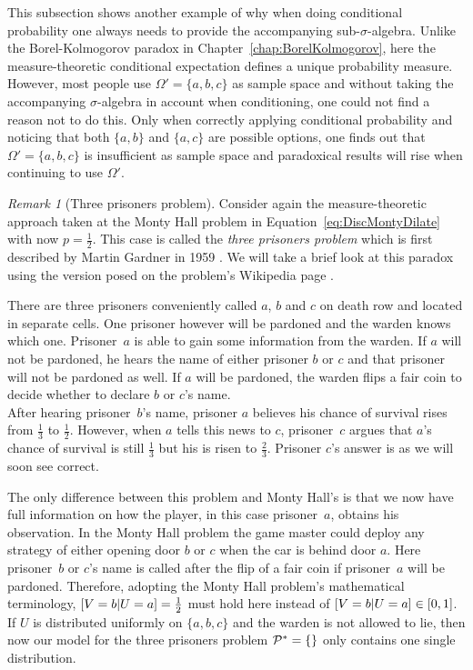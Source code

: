 \documentclass[a4paper]{report}
\theoremstyle{plain}
\theoremstyle{definition}
\theoremstyle{remark}
\newtheorem{remark}[theorem]{Remark}
\numberwithin{equation}{chapter}
\let\P\relax
\DeclareMathOperator{\P}{\mathbb{P}}
\DeclareMathOperator{\1}{\mathbbm{1}}
\newcommand{\Pmod}{\mathcal{P}^*}
\begin{document}
This subsection shows another example of why when doing conditional probability one always needs to provide the accompanying sub-$\sigma$-algebra. Unlike the Borel-Kolmogorov paradox in Chapter~\ref{chap:BorelKolmogorov}, here the measure-theoretic conditional expectation defines a unique probability measure. However, most people use $\Omega'=\{a,b,c\}$ as sample space and without taking the accompanying $\sigma$-algebra in account when conditioning, one could not find a reason not to do this. Only when correctly applying conditional probability and noticing that both $\{a,b\}$ and $\{a,c\}$ are possible options, one finds out that $\Omega'=\{a,b,c\}$ is insufficient as sample space and paradoxical results will rise when continuing to use $\Omega'$.

\begin{remark}[Three prisoners problem]
Consider again the measure-theoretic approach taken at the Monty Hall problem in Equation~\ref{eq:DiscMontyDilate} with now $p=\frac{1}{2}$. This case is called the \emph{three prisoners problem} which is first described by Martin Gardner in 1959 \cite{Gardner59}. We will take a brief look at this paradox using the version posed on the problem's Wikipedia page \cite{WikiPrisoners}.

There are three prisoners conveniently called $a$, $b$ and $c$ on death row and located in separate cells. One prisoner however will be pardoned and the warden knows which one. Prisoner~$a$ is able to gain some information from the warden. If $a$ will not be pardoned, he hears the name of either prisoner $b$ or $c$ and that prisoner will not be pardoned as well. If $a$ will be pardoned, the warden flips a fair coin to decide whether to declare $b$ or $c$'s name.\\
After hearing prisoner~$b$'s name, prisoner $a$ believes his chance of survival rises from $\frac{1}{3}$ to $\frac{1}{2}$. However, when $a$ tells this news to $c$, prisoner~$c$ argues that $a$'s chance of survival is still $\frac{1}{3}$ but his is risen to $\frac{2}{3}$. Prisoner $c$'s answer is as we will soon see correct.

The only difference between this problem and Monty Hall's is that we now have full information on how the player, in this case prisoner~$a$, obtains his observation. In the Monty Hall problem the game master could deploy any strategy of either opening door $b$ or $c$ when the car is behind door $a$. Here prisoner~$b$ or $c$'s name is called after the flip of a fair coin if prisoner~$a$ will be pardoned. Therefore, adopting the Monty Hall problem's mathematical terminology, ${\P[V=b|U=a]=\frac{1}{2}}$ must hold here instead of ${\P[V=b|U=a]\in[0,1]}$. If $U$ is distributed uniformly on $\{a,b,c\}$ and the warden is not allowed to lie, then now our model for the three prisoners problem $\Pmod=\{\P\}$ only contains one single distribution.


\end{remark}
\end{document}
